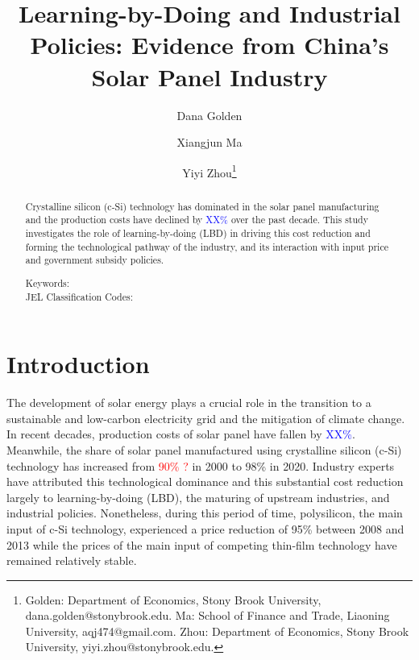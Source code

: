 \documentclass[12pt, letter]{article}
\begin{document}
\title{Learning-by-Doing and Industrial Policies: Evidence from China's Solar Panel Industry}
\author{Dana Golden \and Xiangjun Ma \and  Yiyi Zhou\thanks{Golden: Department of Economics, Stony Brook University, dana.golden@stonybrook.edu. Ma: School of Finance and Trade, Liaoning University, aqj474@gmail.com. Zhou: Department of Economics, Stony Brook University, yiyi.zhou@stonybrook.edu.}}

\maketitle

\begin{abstract}

\singlespacing 

Crystalline silicon (c-Si) technology has dominated in the solar panel manufacturing and the production costs have declined by \textcolor{blue}{XX\%} over the past decade. This study investigates the role of learning-by-doing (LBD) in driving this cost reduction and forming the technological pathway of the industry, and its interaction with input price and government subsidy policies.



\thispagestyle{empty}

\begin{description}
\item[Keywords:] 

\item[JEL Classification Codes:] 
\end{description}
\end{abstract}


\clearpage
\setcounter{page}{1}

\section{Introduction}

The development of solar energy plays a crucial role in the transition to a sustainable and low-carbon electricity grid and the mitigation of climate change. In recent decades, production costs of solar panel have fallen by \textcolor{blue}{XX\%}. Meanwhile, the share of solar panel manufactured using crystalline silicon (c-Si) technology has increased from \textcolor{red}{90\% ?} in 2000 to 98\% in 2020. Industry experts have attributed this technological dominance and this substantial cost reduction largely to learning-by-doing (LBD), the maturing of upstream industries, and industrial policies. Nonetheless, during this period of time, polysilicon, the main input of c-Si technology, experienced a price reduction of 95\% between 2008 and 2013 while the prices of the main input of competing thin-film technology have remained relatively stable.
\end{document}
